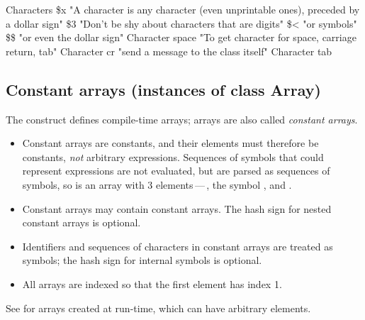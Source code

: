 \documentclass[a4paper,10pt,twoside]{book}
\begin{document}
\begin{script}{Characters}
\$x "A character is any character (even unprintable ones), preceded by a dollar sign"
\$3 "Don't be shy about characters that are digits"
\$< "or symbols"
\$\$ "or even the dollar sign"
Character space "To get character for space, carriage return, tab"
Character cr "send a message to the class itself"
Character tab 
\end{script}

\subsection{Constant arrays (instances of class Array)}
The \ct{#()} construct defines compile-time  arrays; 
\ct{#()} arrays are also called \textit{constant arrays}. 

\begin{itemize}
\item Constant arrays are constants, and their elements must therefore be constants, \emph{not} arbitrary expressions.
Sequences of symbols that could represent expressions are not evaluated, but are parsed as sequences of symbols, so  is an array with 3 elements\,---\,, the symbol \ct{#+}, and .
\item Constant arrays may contain constant arrays. The hash sign for nested constant arrays is optional.
\item Identifiers and sequences of characters in constant arrays are treated as symbols; the hash sign for internal symbols is optional.
\item All arrays are indexed so that the first element has index 1.
\end{itemize}

\noindent
See  for arrays created at run-time, which can have arbitrary elements. 

\end{document}
